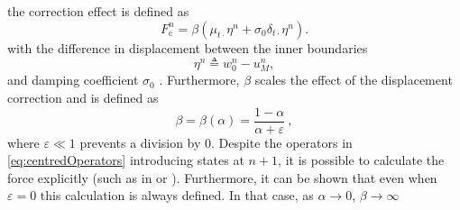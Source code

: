 the correction effect %
is defined as %
\begin{equation}\label{eq:dispCorrForce}
    F_\text{c}^n = \beta \left(\mu_{t\cdot}\eta^n +\sigma_0\delta_{t\cdot}\eta^n \right).
\end{equation}
with the difference in displacement between the inner boundaries
\begin{equation}\label{eq:etaDispCorr}
    \eta^n \triangleq w_0^n - u_M^n,
\end{equation}
and damping coefficient $\sigma_0$%
. Furthermore, $\beta$ scales the effect of the displacement correction and is defined as
\begin{equation}\label{eq:betaDef}
    \beta = \beta(\alpha) = \frac{1-\alpha}{\alpha + \varepsilon}\ ,
\end{equation}
where $\varepsilon \ll 1$ prevents a division by 0. Despite the operators in \eqref{eq:centredOperators} introducing states at $n+1$, it is possible to calculate the force explicitly (such as in \cite{bilbao2009} or \cite{bilbao2009Dafx}). Furthermore, it can be shown that even when $\varepsilon = 0$ this calculation is always defined. In that case, as $\alpha \rightarrow 0$, $\beta\rightarrow \infty$ 

